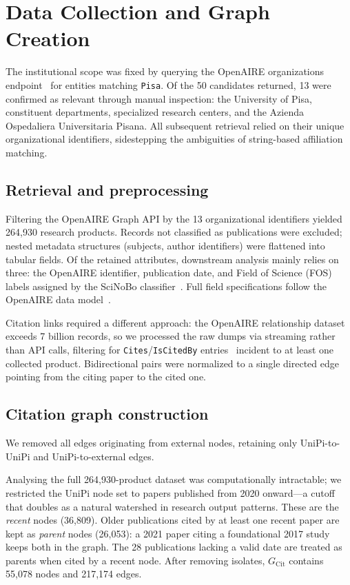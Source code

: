 \section{Data Collection and Graph Creation}\label{sec:DC}

The institutional scope was fixed by querying the OpenAIRE organizations endpoint~\cite{OpenAIRE_graph_9_0_1, openaire_api} for entities matching \texttt{Pisa}. Of the 50 candidates returned, 13 were confirmed as relevant through manual inspection: the University of Pisa, constituent departments, specialized research centers, and the Azienda Ospedaliera Universitaria Pisana. All subsequent retrieval relied on their unique organizational identifiers, sidestepping the ambiguities of string-based affiliation matching.

\subsection{Retrieval and preprocessing}

Filtering the OpenAIRE Graph API by the 13 organizational identifiers yielded 264,930 research products. Records not classified as publications were excluded; nested metadata structures (subjects, author identifiers) were flattened into tabular fields.
Of the retained attributes, downstream analysis mainly relies on three: the OpenAIRE identifier, publication date, and Field of Science (FOS) labels assigned by the SciNoBo classifier~\cite{SciNoBo2023}. Full field specifications follow the OpenAIRE data model~\cite{openaire_research_product}.

Citation links required a different approach: the OpenAIRE relationship dataset exceeds 7 billion records, so we processed the raw dumps via streaming rather than API calls, filtering for \texttt{Cites}/\texttt{IsCitedBy} entries~\cite{openaire_data_model} incident to at least one collected product. Bidirectional pairs were normalized to a single directed edge pointing from the citing paper to the cited one.

\subsection{Citation graph construction}
We removed all edges originating from external nodes, retaining only UniPi-to-UniPi and UniPi-to-external edges.

Analysing the full 264,930-product dataset was computationally intractable; we restricted the UniPi node set to papers published from 2020 onward---a cutoff that doubles as a natural watershed in research output patterns. These are the \textit{recent} nodes (36,809). Older publications cited by at least one recent paper are kept as \textit{parent} nodes (26,053): a 2021 paper citing a foundational 2017 study keeps both in the graph. The 28 publications lacking a valid date are treated as parents when cited by a recent node.
After removing isolates, $G_{\mathrm{Cit}}$ contains 55,078 nodes and 217,174 edges.

